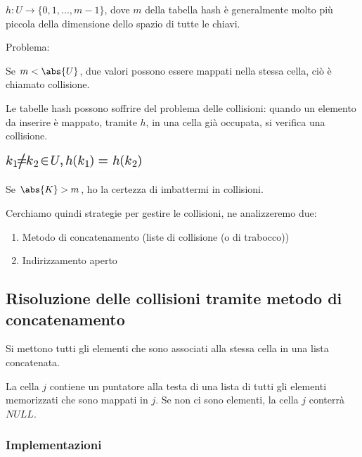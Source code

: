 \documentclass{article}
\providecommand{\tightlist}{%
  \setlength{\itemsep}{0pt}\setlength{\parskip}{0pt}}
\begin{document}
{{}

{$h:U\rightarrow\{0,1,...,m-1\}$, dove $m$ della tabella hash è generalmente molto più piccola della dimensione dello spazio di tutte le chiavi.}

{}

{Problema: }

{Se $m < \abs{U}$, due valori possono essere
mappati nella stessa cella, ciò è chiamato collisione. }

{}

{Le tabelle hash possono soffrire del problema delle collisioni: quando un elemento da inserire è mappato, tramite $h$, in una cella già occupata, si verifica una collisione.}

\includegraphics{images/image237.png}

{}

{Se $\abs{K} > m$, ho la certezza di imbattermi in collisioni.}

{}

{Cerchiamo quindi strategie per gestire le collisioni, ne analizzeremo due:}

\begin{enumerate}
\tightlist
\item
  {Metodo di concatenamento (liste di collisione (o di trabocco))}
\item
  {Indirizzamento aperto}
\end{enumerate}

{}

{}

\hypertarget{h.ocrobrrshwsz}{\subsection{\texorpdfstring{{Risoluzione
delle collisioni tramite metodo di
concatenamento}}{Risoluzione delle collisioni tramite metodo di concatenamento}}\label{h.ocrobrrshwsz}}

{Si mettono tutti gli elementi che sono associati alla stessa cella in
una lista concatenata.}

{}

{La cella $j$ contiene un puntatore alla testa di una lista di tutti gli elementi memorizzati che sono
mappati in $j$. Se non ci sono elementi, la cella $j$ conterrà $NULL$.}

{}

\hypertarget{h.lhp1y3nzdu6x}{\subsubsection{\texorpdfstring{{Implementazioni}}{Implementazioni}}\label{h.lhp1y3nzdu6x}}

}
\end{document}
